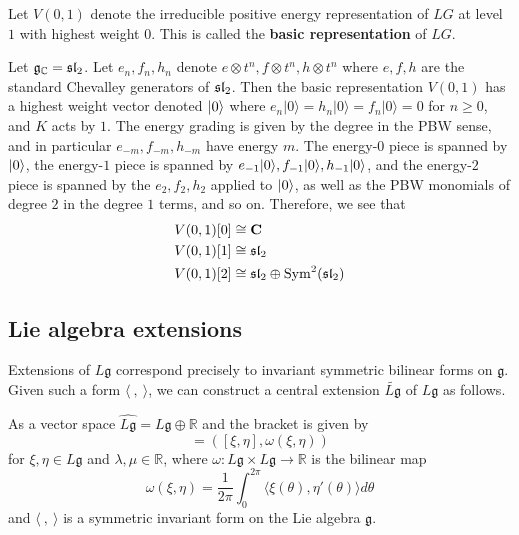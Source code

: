 \documentclass[12pt]{article}
\begin{document}
Let $V(0,1)$ denote the irreducible positive energy representation of $LG$ at level $1$ with highest weight $0$. This is called the \textbf{basic representation} of $LG$. 

\begin{example}
    Let $\mf g_\C = \sl_2$. Let $e_n,f_n,h_n$ denote $e\otimes t^n,f\otimes t^n,h\otimes t^n$ where $e,f,h$ are the standard Chevalley generators of $\sl_2$. Then the basic representation $V(0,1)$ has a highest weight vector denoted $\ket{0}$ where $e_n\lvert 0\rangle=h_n\lvert 0\rangle=f_n\lvert 0\rangle=0$ for $n\ge 0$, and $K$ acts by $1$. The energy grading is given by the degree in the PBW sense, and in particular $e_{-m},f_{-m},h_{-m}$ have energy $m$. The energy-$0$ piece is spanned by $\ket{0}$, the energy-$1$ piece is spanned by $e_{-1}\ket{0},f_{-1}\ket{0},h_{-1}\ket{0}$, and the energy-$2$ piece is spanned by the $e_2,f_2,h_2$ applied to $\ket{0}$, as well as the PBW monomials of degree $2$ in the degree $1$ terms, and so on. Therefore, we see that \begin{align*}
        V(0,1)[0] &\cong \mathbf C \\
V(0,1)[1] &\cong \sl_2 \\
V(0,1)[2] &\cong \sl_2 \oplus \mathrm{Sym}^2(\sl_2)
    \end{align*}
\end{example}

\subsection{Lie algebra extensions}

Extensions of $L\mathfrak{g}$ correspond precisely to invariant symmetric bilinear forms on $\mathfrak{g}$. Given such a form $\langle \ , \ \rangle$, we can construct a central extension $\widetilde{L\mathfrak{g}}$ of $L\mathfrak{g}$ as follows.

As a vector space
$\widehat{L\mathfrak{g}} = L\mathfrak{g} \oplus \mathbb{R}$
and the bracket is given by
\begin{equation}
    [(\xi,\lambda), (\eta,\mu)] = ([\xi,\eta],  \omega(\xi,\eta))
\end{equation}
for $\xi,\eta \in L\mathfrak{g}$ and $\lambda,\mu \in \mathbb{R}$, where
$\omega : L\mathfrak{g} \times L\mathfrak{g} \to \mathbb{R}$ is the bilinear map
\begin{equation} \label{eq:4.2.2}
    \omega(\xi,\eta) = \frac{1}{2\pi} \int_0^{2\pi} \langle \xi(\theta), \eta'(\theta)\rangle  d\theta
\end{equation}
and $\langle \ , \ \rangle$ is a symmetric invariant form on the Lie algebra
$\mathfrak{g}$. 
\end{document}
